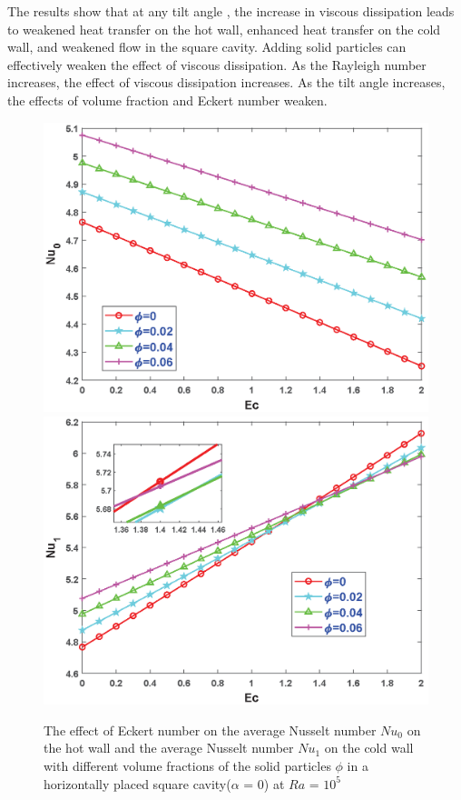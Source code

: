 \documentclass[12pt]{llncs}
\begin{document}


The results show that at any tilt angle , the increase in viscous dissipation leads to weakened heat transfer on the hot wall, enhanced heat transfer on the cold wall, and weakened flow in the square cavity. Adding solid particles can effectively weaken the effect of viscous dissipation. As the Rayleigh number increases, the effect of viscous dissipation increases. As the tilt angle increases, the effects of volume fraction and Eckert number weaken.

\begin{figure}[htb]
 \centering
\vspace{-4cm}  
\setlength{\abovecaptionskip}{-3.cm}  
\includegraphics[width=0.48\linewidth]{1.eps} %
\includegraphics[width=0.48\linewidth]{2.eps} %
\caption{The effect of Eckert number on the average Nusselt number $Nu_{0}$ on the hot wall and the average Nusselt number $Nu_{1}$ on the cold wall with different volume fractions of the solid particles $\phi$ in a horizontally placed square cavity($\alpha$ = 0) at $Ra$ = $10^{5}$ }
%
\end{figure}
\end{document}
